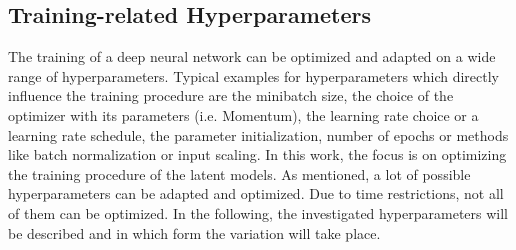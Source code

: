 \documentclass[12pt,DIV14,BCOR12mm,a4paper,footexclude,headinclude,halfparskip-,twoside,openright,cleardoubleempty,idxtotoc,bibtotoc,listtotoc]{scrreprt} %
\numberwithin{equation}{chapter}
\begin{document}
\subsection{Training-related Hyperparameters}\label{subsec:Training-related Hyperparameters}
The training of a deep neural network can be optimized and adapted on a wide range of hyperparameters. Typical examples for hyperparameters which directly influence the training procedure are the minibatch size, the choice of the optimizer with its parameters (i.e. Momentum), the learning rate choice or a learning rate schedule, the parameter initialization, number of epochs or methods like batch normalization or input scaling. In this work, the focus is on optimizing the training procedure of the latent models. As mentioned, a lot of possible hyperparameters can be adapted and optimized. Due to time restrictions, not all of them can be optimized. In the following, the investigated hyperparameters will be described and in which form the variation will take place.
\end{document}
